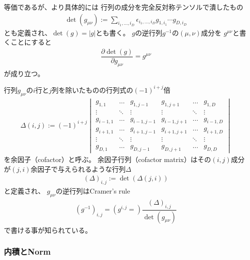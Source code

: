 等価であるが、より具体的には
行列の成分を完全反対称テンソルで潰したもの
\begin{align}
    \det(g_{\mu\nu})
    :=
    \sum_{i_1,\dots,i_D}
    \epsilon_{i_1,\dots,i_D}
    g_{1, i_1}
    \cdots
    g_{D, i_D}
\end{align}
とも定義され、$\det(g) = |g|$とも書く。
$g$の逆行列$g^{-1}$の$(\mu,\nu)$成分を
$g^{\mu\nu}$と書くことにすると
\begin{align}
    \dfrac{\partial \det(g)}{\partial g_{\mu\nu}}
    =
    g^{\mu\nu}
\end{align}
が成り立つ。

行列$g_{\mu\nu}$の$i$行と$j$列を除いたものの行列式の$(-1)^{i+j}$倍
\begin{align}
    \Delta(i,j) :=
    (-1)^{i+j}
    \begin{vmatrix}
        g_{1,1} & \dots & g_{1,j-1} & g_{1,j+1} & \dots & g_{1,D}
    \\
        \vdots & \ddots & \vdots & \vdots & \ddots & \vdots
    \\
        g_{i-1,1} & \dots & g_{i-1,j-1} & g_{i-1,j+1} & \dots & g_{i-1,D}
    \\
        g_{i+1,1} & \dots & g_{i+1,j-1} & g_{i+1,j+1} & \dots & g_{i+1,D}
    \\
        \vdots & \ddots & \vdots & \vdots & \ddots & \vdots
    \\
        g_{D,1} & \dots & g_{D,j-1} & g_{D,j+1} & \dots & g_{D,D}
    \end{vmatrix}
\end{align}
を余因子（cofactor）と呼ぶ。
余因子行列（cofactor matrix）はその$(i,j)$成分が$(j,i)$余因子で与えられるような行列$\Delta$
\begin{align}
    (\Delta)_{i,j} := \det(\Delta(j,i))
\end{align}
と定義され、
$g_{\mu\nu}$の逆行列はCramer's rule
\begin{align}
    (g^{-1})_{i,j}
    = ( g^{i,j} = )
    \dfrac{ (\Delta)_{i,j} }
    { \det(g_{\mu\nu}) }
\end{align}
で書ける事が知られている。

\subsubsection{内積とNorm}
\label{subsubsec: inner product}

